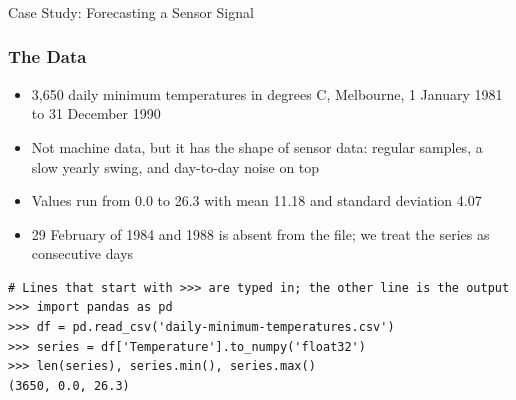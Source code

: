 

\begin{frame}[fragile]\frametitle{}
\begin{center}
{\Large Case Study: Forecasting a Sensor Signal}
\end{center}
\end{frame}

\begin{frame}[fragile]\frametitle{The Data}
\begin{itemize}
\item 3,650 daily minimum temperatures in degrees C, Melbourne, 1 January 1981 to 31 December 1990
\item Not machine data, but it has the shape of sensor data: regular samples, a slow yearly swing, and day-to-day noise on top
\item Values run from 0.0 to 26.3 with mean 11.18 and standard deviation 4.07
\item 29 February of 1984 and 1988 is absent from the file; we treat the series as consecutive days
\end{itemize}
%
%
\begin{lstlisting}
# Lines that start with >>> are typed in; the other line is the output
>>> import pandas as pd
>>> df = pd.read_csv('daily-minimum-temperatures.csv')
>>> series = df['Temperature'].to_numpy('float32')
>>> len(series), series.min(), series.max()
(3650, 0.0, 26.3)
\end{lstlisting}
\end{frame}

